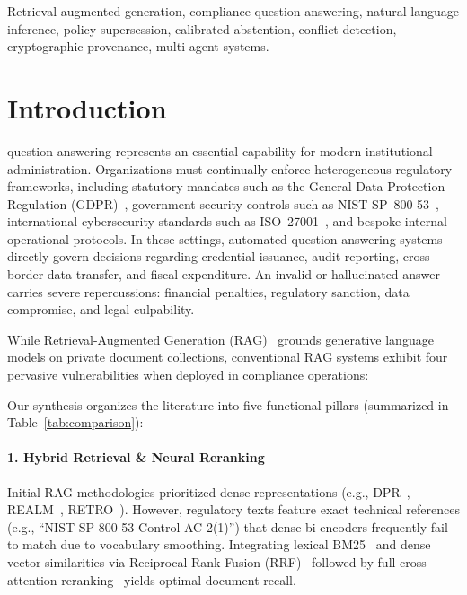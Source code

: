 \documentclass[journal,twoside]{IEEEtran}
\begin{document}
\begin{IEEEkeywords}
Retrieval-augmented generation, compliance question answering, natural language inference, policy supersession, calibrated abstention, conflict detection, cryptographic provenance, multi-agent systems.
\end{IEEEkeywords}

\section{Introduction}
\label{sec:intro}

 question answering represents an essential capability for modern institutional administration.
Organizations must continually enforce heterogeneous regulatory frameworks, including statutory mandates such as the General Data Protection Regulation (GDPR)~\cite{gdpr2016}, government security controls such as NIST SP~800-53~\cite{nist2020}, international cybersecurity standards such as ISO~27001~\cite{iso27001}, and bespoke internal operational protocols.
In these settings, automated question-answering systems directly govern decisions regarding credential issuance, audit reporting, cross-border data transfer, and fiscal expenditure.
An invalid or hallucinated answer carries severe repercussions: financial penalties, regulatory sanction, data compromise, and legal culpability.

While Retrieval-Augmented Generation (RAG)~\cite{lewis2020rag} grounds generative language models on private document collections, conventional RAG systems exhibit four pervasive vulnerabilities when deployed in compliance operations:



Our synthesis organizes the literature into five functional pillars (summarized in Table~\ref{tab:comparison}):

\paragraph{1. Hybrid Retrieval \& Neural Reranking}
Initial RAG methodologies prioritized dense representations (e.g., DPR~\cite{karpukhin2020dpr}, REALM~\cite{guu2020realm}, RETRO~\cite{borgeaud2022retro}).
However, regulatory texts feature exact technical references (e.g., ``NIST SP 800-53 Control AC-2(1)'') that dense bi-encoders frequently fail to match due to vocabulary smoothing.
Integrating lexical BM25~\cite{robertson2009bm25} and dense vector similarities via Reciprocal Rank Fusion (RRF)~\cite{cormack2009rrf} followed by full cross-attention reranking~\cite{nogueira2020reranking} yields optimal document recall.
\end{document}
